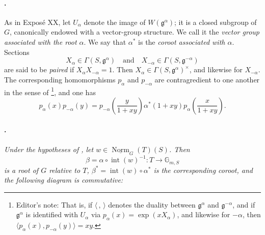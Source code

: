 \paragraph{.}
As in Exposé XX, let \(U_\alpha\) denote the image of
\(W(\mathfrak g^\alpha)\); it is a closed subgroup of \(G\),
canonically endowed with a vector-group structure. We call it the
\emph{vector group associated with the root \(\alpha\)}. We say that
\(\alpha^*\) is the \emph{coroot associated with \(\alpha\)}. Sections
\[
  X_\alpha\in\Gamma(S,\mathfrak g^\alpha)
  \quad\text{and}\quad
  X_{-\alpha}\in\Gamma(S,\mathfrak g^{-\alpha})
\]
are said to be \emph{paired} if \(X_\alpha X_{-\alpha}=1\). Then
\(X_\alpha\in\Gamma(S,\mathfrak g^\alpha)^\times\), and likewise for
\(X_{-\alpha}\). The corresponding homomorphisms \(p_\alpha\) and
\(p_{-\alpha}\) are contragredient to one another in the sense of
\footnote{Editor's note: That is, if
\(\langle\, ,\,\rangle\) denotes the duality between
\(\mathfrak g^\alpha\) and \(\mathfrak g^{-\alpha}\), and if
\(\mathfrak g^\alpha\) is identified with \(U_\alpha\) via
\(p_\alpha(x)=\exp(xX_\alpha)\), and likewise for \(-\alpha\), then
\(\langle p_\alpha(x),p_{-\alpha}(y)\rangle=xy\).}, and one has
\[
  p_\alpha(x)p_{-\alpha}(y)
  =
  p_{-\alpha}\left(\frac{y}{1+xy}\right)
  \alpha^*(1+xy)
  p_\alpha\left(\frac{x}{1+xy}\right).
\]

\paragraph{.}
\textit{Under the hypotheses of , let
\(w\in\underline{\operatorname{Norm}}_G(T)(S)\). Then}
\[
  \beta=\alpha\circ\operatorname{int}(w)^{-1}
  :T\longrightarrow\mathbb G_{m,S}
\]
\textit{is a root of \(G\) relative to \(T\),
\(\beta^*=\operatorname{int}(w)\circ\alpha^*\) is the corresponding
coroot, and the following diagram is commutative:}

\begin{center}


\end{center}

